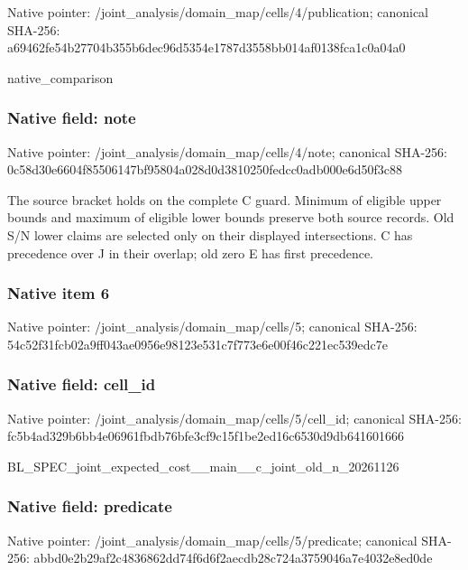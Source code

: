 \documentclass[10pt,a4paper]{article}
\begin{document}
Native pointer: /joint\_analysis/domain\_m\allowbreak{}ap/cells/4/publication; canonical SHA-256: a69462fe54b27704b355b6de\allowbreak{}c96d5354e1787d3558bb014a\allowbreak{}f0138fca1c0a04a0


native\_comparison


\subsubsection{Native field: note}


Native pointer: /joint\_analysis/domain\_map/cells/4/note; canonical SHA-256: 0c58d30e6604f85506147bf9\allowbreak{}5804a028d0d3810250fedcc0\allowbreak{}adb000e6d50f3c88


The source bracket holds on the complete C guard. Minimum of eligible upper bounds and maximum of eligible lower bounds preserve both source records. Old S/N lower claims are selected only on their displayed intersections. C has precedence over J in their overlap; old zero E has first precedence.


\subsubsection{Native item 6}


Native pointer: /joint\_analysis/domain\_map/cells/5; canonical SHA-256: 54c52f31fcb02a9ff043ae09\allowbreak{}56e98123e531c7f773e6e00f\allowbreak{}46c221ec539edc7e



\subsubsection{Native field: cell\_id}


Native pointer: /joint\_analysis/domain\_m\allowbreak{}ap/cells/5/cell\_id; canonical SHA-256: fc5b4ad329b6bb4e06961fbd\allowbreak{}b76bfe3cf9c15f1be2ed16c6\allowbreak{}530d9db641601666


BL\_SPEC\_joint\_expected\_c\allowbreak{}ost\_\_main\_\_c\_joint\_old\_n\allowbreak{}\_20261126


\subsubsection{Native field: predicate}


Native pointer: /joint\_analysis/domain\_m\allowbreak{}ap/cells/5/predicate; canonical SHA-256: abbd0e2b29af2c4836862dd7\allowbreak{}4f6d6f2aecdb28c724a37590\allowbreak{}46a7e4032e8ed0de
\end{document}
